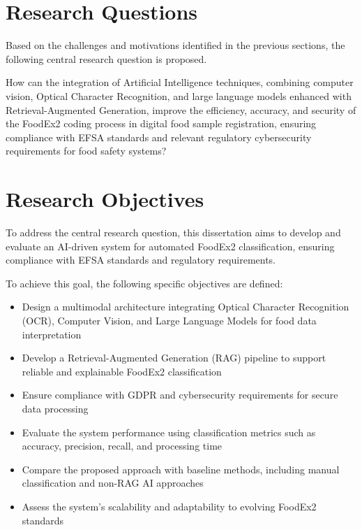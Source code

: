 \hypertarget{research-questions}{%
\section{Research Questions}\label{research-questions}}

Based on the challenges and motivations identified in the previous sections, the following central research question is proposed.

How can the integration of Artificial Intelligence techniques, combining computer vision, Optical Character Recognition, and large language models enhanced with Retrieval-Augmented Generation, improve the efficiency, accuracy, and security of the FoodEx2 coding process in digital food sample registration, ensuring compliance with EFSA standards and relevant regulatory cybersecurity requirements for food safety systems?

\hypertarget{research-objectives}{%
\section{Research Objectives}\label{research-objectives}}

To address the central research question, this dissertation aims to develop and evaluate an AI-driven system for automated FoodEx2 classification, ensuring compliance with EFSA standards and regulatory requirements.

To achieve this goal, the following specific objectives are defined:

\begin{itemize}
\item
  Design a multimodal architecture integrating Optical Character Recognition (OCR), Computer Vision, and Large Language Models for food data interpretation
\item
  Develop a Retrieval-Augmented Generation (RAG) pipeline to support reliable and explainable FoodEx2 classification
\item
  Ensure compliance with GDPR and cybersecurity requirements for secure data processing
\item
  Evaluate the system performance using classification metrics such as accuracy, precision, recall, and processing time
\item
  Compare the proposed approach with baseline methods, including manual classification and non-RAG AI approaches
\item
  Assess the system's scalability and adaptability to evolving FoodEx2 standards
\end{itemize}

